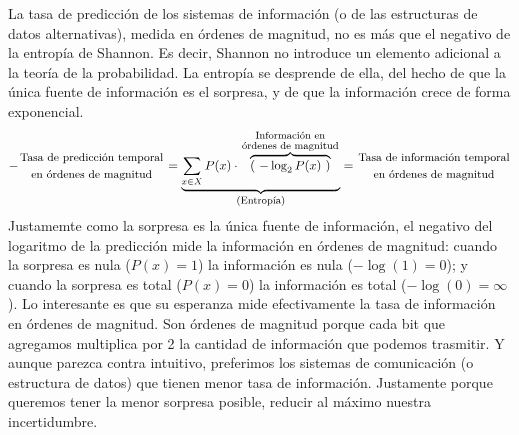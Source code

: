 \documentclass[a4paper,11pt]{book}
\newcommand\hfrac[2]{\genfrac{}{}{0pt}{}{#1}{#2}} %
\theoremstyle{definition}
\begin{document}

La tasa de predicci\'on de los sistemas de informaci\'on (o de las estructuras de datos alternativas), medida en \'ordenes de magnitud, no es m\'as que el negativo de la entrop\'ia de Shannon.
%
Es decir, Shannon no introduce un elemento adicional a la teor\'ia de la probabilidad.
%
La entrop\'ia se desprende de ella, del hecho de que la \'unica fuente de informaci\'on es el sorpresa, y de que la informaci\'on crece de forma exponencial.
%
\begin{equation*}
- \hfrac{\text{\small Tasa de predicci\'on temporal}}{\text{\small en \'ordenes de magnitud}} = \underbrace{\sum_{x\in X} P(x) \cdot \overbrace{(\ - \log_2 P(x) \ )}^{\hfrac{\text{\footnotesize \phantom{p}Informaci\'on en\phantom{p}}}{\text{\footnotesize \'ordenes de magnitud}}}}_{\text{\footnotesize (Entrop\'ia)}} = \hfrac{\text{\small Tasa de informaci\'on temporal}}{\text{\small en \'ordenes de magnitud}}
\end{equation*}
%
Justamemte como la sorpresa es la \'unica fuente de informaci\'on, el negativo del logaritmo de la predicci\'on mide la informaci\'on en \'ordenes de magnitud: cuando la sorpresa es nula ($P(x)=1$) la informaci\'on es nula ($-\log(1) = 0$); y cuando la sorpresa es total ($P(x)=0$) la informaci\'on es total ($-\log(0) = \infty$).
%
Lo interesante es que su esperanza mide efectivamente la tasa de informaci\'on en \'ordenes de magnitud.
%
Son \'ordenes de magnitud porque cada bit que agregamos multiplica por 2 la cantidad de informaci\'on que podemos trasmitir.
%
Y aunque parezca contra intuitivo, preferimos los sistemas de comunicaci\'on (o estructura de datos) que tienen menor tasa de informaci\'on.
%
Justamente porque queremos tener la menor sorpresa posible, reducir al m\'aximo nuestra incertidumbre.

\end{document}
